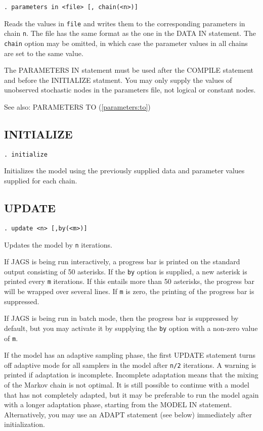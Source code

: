 \documentclass[11pt, a4paper, titlepage]{report}
\begin{document}
\begin{verbatim}
. parameters in <file> [, chain(<n>)]
\end{verbatim}
Reads the values in \texttt{file} and writes them to the corresponding
parameters in chain \texttt{n}. The file has the same format as the
one in the DATA IN statement.  The \texttt{chain} option may be
omitted, in which case the parameter values in all chains are set to
the same value.

The PARAMETERS IN statement must be used after the COMPILE statement
and before the INITIALIZE statment.  You may only supply the values of
unobserved stochastic nodes in the parameters file, not logical or
constant nodes.

See also: PARAMETERS TO (\ref{parameters:to})

\subsection{INITIALIZE}

\begin{verbatim}
. initialize
\end{verbatim}
Initializes the model using the previously supplied data and parameter
values supplied for each chain.

\subsection{UPDATE}

\begin{verbatim}
. update <n> [,by(<m>)]
\end{verbatim}
Updates the model by \texttt{n} iterations. 

If JAGS is being run interactively, a progress bar is printed on the
standard output consisting of 50 asterisks. If the \texttt{by} option
is supplied, a new asterisk is printed every \texttt{m} iterations. If
this entails more than 50 asterisks, the progress bar will be wrapped
over several lines.  If \texttt{m} is zero, the printing of the
progress bar is suppressed.

If JAGS is being run in batch mode, then the progress bar is
suppressed by default, but you may activate it by supplying the
\texttt{by} option with a non-zero value of \texttt{m}.

If the model has an adaptive sampling phase, the first UPDATE
statement turns off adaptive mode for all samplers in the model after
\texttt{n/2} iterations. A warning is printed if adaptation is
incomplete. Incomplete adaptation means that the mixing of the Markov
chain is not optimal. It is still possible to continue with a model
that has not completely adapted, but it may be preferable to run the
model again with a longer adaptation phase, starting from the MODEL IN
statement. Alternatively, you may use an ADAPT statement (see below)
immediately after initialization.
\end{document}
